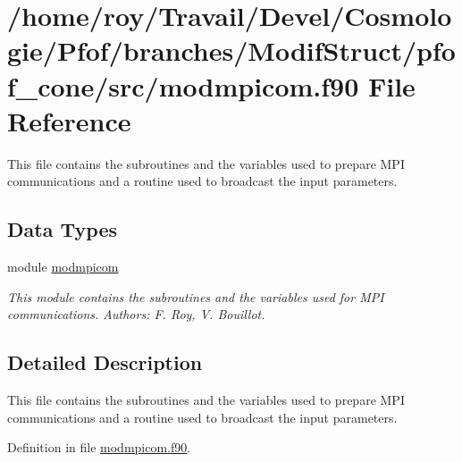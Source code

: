\hypertarget{pfof__cone_2src_2modmpicom_8f90}{\section{/home/roy/\-Travail/\-Devel/\-Cosmologie/\-Pfof/branches/\-Modif\-Struct/pfof\-\_\-cone/src/modmpicom.f90 File Reference}
\label{pfof__cone_2src_2modmpicom_8f90}
}


This file contains the subroutines and the variables used to prepare M\-P\-I communications and a routine used to broadcast the input parameters.  


\subsection*{Data Types}
\begin{DoxyCompactItemize}
\item 
module \hyperlink{classmodmpicom}{modmpicom}
\begin{DoxyCompactList}\small\item\em This module contains the subroutines and the variables used for M\-P\-I communications. Authors\-: F. Roy, V. Bouillot. \end{DoxyCompactList}\end{DoxyCompactItemize}


\subsection{Detailed Description}
This file contains the subroutines and the variables used to prepare M\-P\-I communications and a routine used to broadcast the input parameters. 

Definition in file \hyperlink{pfof__cone_2src_2modmpicom_8f90_source}{modmpicom.\-f90}.

